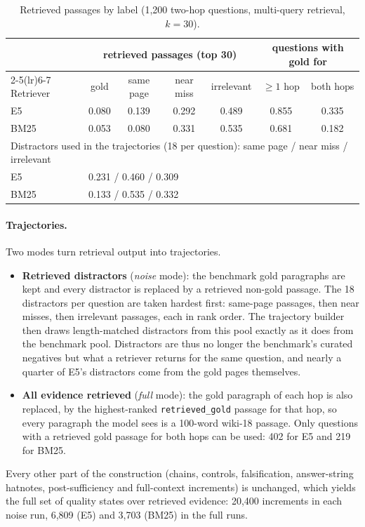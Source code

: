 \begin{table}[h]
\centering\small
\begin{tabular}{lcccccc}
\toprule
& \multicolumn{4}{c}{retrieved passages (top 30)} & \multicolumn{2}{c}{questions with gold for} \\
\cmidrule(lr){2-5}\cmidrule(lr){6-7}
Retriever & gold & same page & near miss & irrelevant & $\ge1$ hop & both hops \\
\midrule
E5 & 0.080 & 0.139 & 0.292 & 0.489 & 0.855 & 0.335 \\
BM25 & 0.053 & 0.080 & 0.331 & 0.535 & 0.681 & 0.182 \\
\midrule
\multicolumn{7}{l}{Distractors used in the trajectories (18 per question): same page / near miss / irrelevant} \\
E5 & \multicolumn{6}{l}{0.231 / 0.460 / 0.309} \\
BM25 & \multicolumn{6}{l}{0.133 / 0.535 / 0.332} \\
\bottomrule
\end{tabular}
\caption{Retrieved passages by label (1{,}200 \musique{} two-hop questions, multi-query retrieval, $k=30$).}
\label{tab:estb-retrieval}
\end{table}

\paragraph{Trajectories.} Two modes turn retrieval output into trajectories.
\begin{itemize}
  \item \textbf{Retrieved distractors} (\emph{noise} mode): the benchmark gold paragraphs are kept and every distractor is replaced by a retrieved non-gold passage. The 18 distractors per question are taken hardest first: same-page passages, then near misses, then irrelevant passages, each in rank order. The trajectory builder then draws length-matched distractors from this pool exactly as it does from the benchmark pool. Distractors are thus no longer the benchmark's curated negatives but what a retriever returns for the same question, and nearly a quarter of E5's distractors come from the gold pages themselves.
  \item \textbf{All evidence retrieved} (\emph{full} mode): the gold paragraph of each hop is also replaced, by the highest-ranked \texttt{retrieved\_gold} passage for that hop, so every paragraph the model sees is a 100-word wiki-18 passage. Only questions with a retrieved gold passage for both hops can be used: 402 for E5 and 219 for BM25.
\end{itemize}
Every other part of the construction (chains, controls, falsification, answer-string hatnotes, post-sufficiency and full-context increments) is unchanged, which yields the full set of quality states over retrieved evidence: 20{,}400 increments in each noise run, 6{,}809 (E5) and 3{,}703 (BM25) in the full runs.

